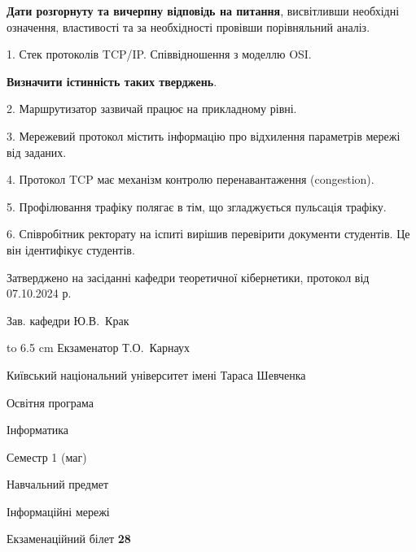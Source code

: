 \documentclass[12pt, ukrainian]{article}
\begin{document}
{
\qquad\textbf{Дати розгорнуту та вичерпну відповідь на питання}, висвітливши необхідні означення, властивості та за необхідності провівши порівняльний аналіз.

1. Стек протоколів TCP/IP. Співвідношення з моделлю OSI.



\qquad\textbf{Визначити істинність таких тверджень}.

2. Маршрутизатор зазвичай працює на прикладному рівні.


3. Мережевий протокол містить інформацію про відхилення параметрів мережі від заданих.


4. Протокол TCP має механізм контролю перенавантаження (congestion).


5. Профілювання трафіку полягає в тім, що згладжується пульсація трафіку.


6. Співробітник ректорату на іспиті вирішив перевірити документи студентів. Це він ідентифікує студентів.

}
{\smallskip\smallskip \begin {scriptsize} Затверджено на засіданні кафедри теоретичної кібернетики, протокол   від   07.10.2024 р.\par\smallskip\smallskip\smallskip\smallskip
{\parbox {6.5 cm} {Зав. кафедри \dotfill Ю.В.~Крак}}\hspace {0.7cm} {\hbox to 6.5 cm { Екзаменатор \dotfill Т.О.~Карнаух}} \end{scriptsize}}
\newpage
{{\begin {scriptsize}\par
{ \center  Київський національний університет імені Тараса Шевченка \par}
{\parbox {5 cm}{Освітня програма \hfill}{\parbox {7 cm}{Інформатика\hfill}}\parbox {6 cm}{\hfill Семестр 1 (маг)}}\par
{\parbox {5 cm} {Навчальний предмет \hfill}\parbox {7 cm}{Інформаційні мережі \hfill}\parbox {6cm}{\hfill}\par}\vspace{-15pt} \end{scriptsize}}{\center Екзаменаційний білет \No \textbf { 28 }\par}}
\end{document}
